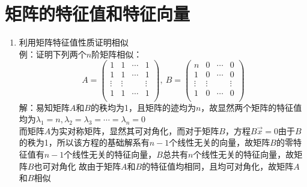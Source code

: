 \documentclass[12pt,a4paper,UTF8]{book}
\begin{document}
\section{矩阵的特征值和特征向量}
\begin{enumerate}
\item 利用矩阵特征值性质证明相似\\
例：证明下列两个$n$阶矩阵相似：
\[A=\begin{pmatrix}1&1&\cdots&1\\1&1&\cdots&1\\\vdots&\vdots&\ &\vdots\\1&1&\cdots&1\\\end{pmatrix},\ B=\begin{pmatrix}n&0&\cdots&0\\1&0&\cdots&0\\\vdots&\vdots&\ &\vdots\\1&0&\cdots&0\\\end{pmatrix}\]
解：易知矩阵$A$和$B$的秩均为1，且矩阵的迹均为$n$，故显然两个矩阵的特征值均为$\lambda_1=n,\lambda_2=\lambda_3=\cdots=\lambda_n=0$\\
而矩阵$A$为实对称矩阵，显然其可对角化，而对于矩阵$B$，方程$B\vec{x}=0$由于$B$的秩为1，所以该方程的基础解系有$n-1$个线性无关的向量，故矩阵$B$的零特征值有$n-1$个线性无关的特征向量，$B$总共有$n$个线性无关的特征向量，故矩阵$B$也可对角化
故由于矩阵$A$和$B$的特征值均相同，且均可对角化，故矩阵$A$和$B$相似
\end{enumerate}
\end{document}
